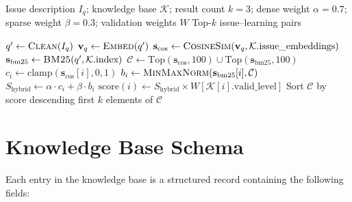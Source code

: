 \begin{algorithm}[h]
\caption{Hybrid Tool Retrieval}
\label{alg:tool-retrieval}
\begin{algorithmic}[1]
\REQUIRE Issue description $I_q$; knowledge base $\mathcal{K}$; result count $k{=}3$; dense weight $\alpha{=}0.7$; sparse weight $\beta{=}0.3$; validation weights $W$
\ENSURE Top-$k$ issue--learning pairs

\STATE $q' \leftarrow \textsc{Clean}(I_q)$ 
\STATE $\mathbf{v}_q \leftarrow \textsc{Embed}(q')$
\STATE $\mathbf{s}_{\cos} \leftarrow \textsc{CosineSim}(\mathbf{v}_q, \mathcal{K}.\text{issue\_embeddings})$
\STATE $\mathbf{s}_{\text{bm25}} \leftarrow \textsc{BM25}(q', \mathcal{K}.\text{index})$
\STATE $\mathcal{C} \leftarrow \text{Top}(\mathbf{s}_{\cos}, 100) \cup \text{Top}(\mathbf{s}_{\text{bm25}}, 100)$ 
    \STATE $c_i \leftarrow \text{clamp}(\mathbf{s}_{\cos}[i], 0, 1)$
    \STATE $b_i \leftarrow \textsc{MinMaxNorm}(\mathbf{s}_{\text{bm25}}[i], \mathcal{C})$
    \STATE $S_{\text{hybrid}} \leftarrow \alpha \cdot c_i + \beta \cdot b_i$
    \STATE $\text{score}(i) \leftarrow S_{\text{hybrid}} \times W[\mathcal{K}[i].\text{valid\_level}]$
\ENDFOR
\STATE Sort $\mathcal{C}$ by score descending
\RETURN first $k$ elements of $\mathcal{C}$
\end{algorithmic}
\end{algorithm}

\section{Knowledge Base Schema}
\label{app:kb-schema}

Each entry in the knowledge base is a structured record containing the following fields:

